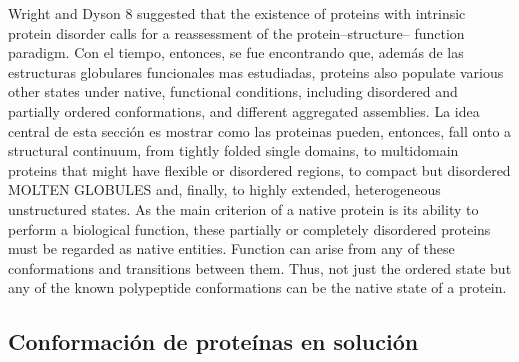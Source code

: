 Wright and Dyson 8 suggested that the existence of proteins with intrinsic protein disorder calls for a reassessment of the protein–structure– function paradigm.
Con el tiempo, entonces, se fue encontrando que, además de las estructuras globulares funcionales mas estudiadas, proteins also populate various other states under native, functional conditions, including disordered and partially ordered conformations, and different aggregated assemblies.
La idea central de esta sección es mostrar como las proteinas pueden, entonces, fall onto a structural continuum, from tightly folded single domains, to multidomain proteins that might have flexible or disordered regions, to compact but disordered MOLTEN GLOBULES and, finally, to highly extended, heterogeneous unstructured states.
As the main criterion of a native protein is its ability to perform a biological function, these partially or completely disordered proteins must be regarded as native entities.
Function can arise from any of these conformations and transitions between them. Thus, not just the ordered state but any of the known polypeptide conformations can be the native state of a protein.




































\subsection{Conformación de proteínas en solución}
\label{conformationalLandscape}














